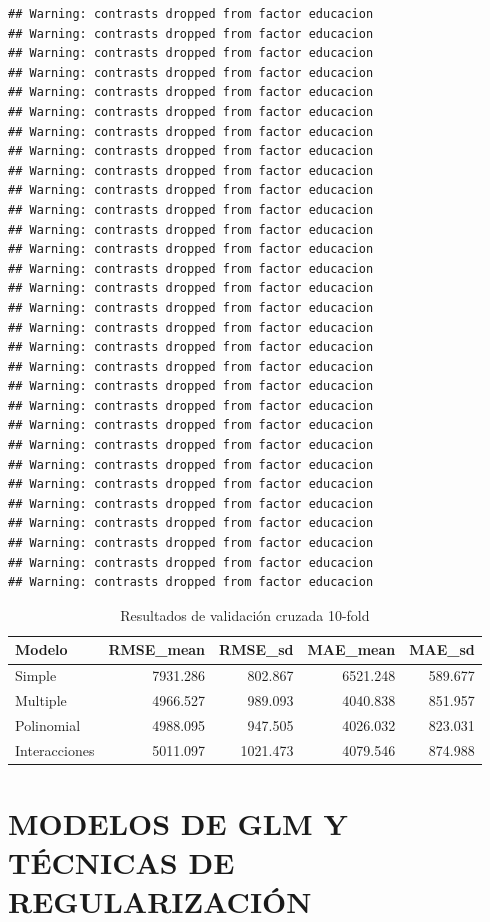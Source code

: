 \documentclass[
  oneside]{book}
\begin{document}
\begin{verbatim}
## Warning: contrasts dropped from factor educacion
## Warning: contrasts dropped from factor educacion
## Warning: contrasts dropped from factor educacion
## Warning: contrasts dropped from factor educacion
## Warning: contrasts dropped from factor educacion
## Warning: contrasts dropped from factor educacion
## Warning: contrasts dropped from factor educacion
## Warning: contrasts dropped from factor educacion
## Warning: contrasts dropped from factor educacion
## Warning: contrasts dropped from factor educacion
## Warning: contrasts dropped from factor educacion
## Warning: contrasts dropped from factor educacion
## Warning: contrasts dropped from factor educacion
## Warning: contrasts dropped from factor educacion
## Warning: contrasts dropped from factor educacion
## Warning: contrasts dropped from factor educacion
## Warning: contrasts dropped from factor educacion
## Warning: contrasts dropped from factor educacion
## Warning: contrasts dropped from factor educacion
## Warning: contrasts dropped from factor educacion
## Warning: contrasts dropped from factor educacion
## Warning: contrasts dropped from factor educacion
## Warning: contrasts dropped from factor educacion
## Warning: contrasts dropped from factor educacion
## Warning: contrasts dropped from factor educacion
## Warning: contrasts dropped from factor educacion
## Warning: contrasts dropped from factor educacion
## Warning: contrasts dropped from factor educacion
## Warning: contrasts dropped from factor educacion
## Warning: contrasts dropped from factor educacion
\end{verbatim}

\begin{table}
\centering
\caption{\label{tab:k-fold-cv}Resultados de validación cruzada 10-fold}
\centering
\begin{tabular}[t]{l|r|r|r|r}
\hline
Modelo & RMSE\_mean & RMSE\_sd & MAE\_mean & MAE\_sd\\
\hline
Simple & 7931.286 & 802.867 & 6521.248 & 589.677\\
\hline
Multiple & 4966.527 & 989.093 & 4040.838 & 851.957\\
\hline
Polinomial & 4988.095 & 947.505 & 4026.032 & 823.031\\
\hline
Interacciones & 5011.097 & 1021.473 & 4079.546 & 874.988\\
\hline
\end{tabular}
\end{table}

\section{MODELOS DE GLM Y TÉCNICAS DE REGULARIZACIÓN}\label{modelos-de-glm-y-tuxe9cnicas-de-regularizaciuxf3n}
\end{document}

